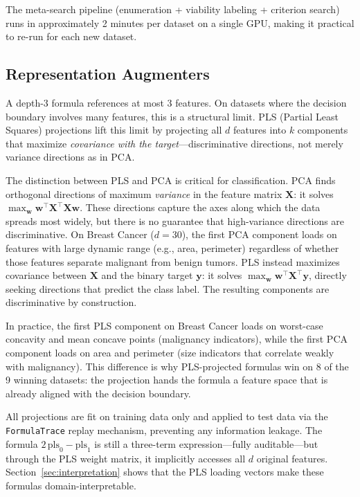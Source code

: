 \documentclass[journal]{IEEEtran}
\begin{document}
The meta-search pipeline (enumeration + viability labeling +
criterion search) runs in approximately 2 minutes per dataset on a
single GPU, making it practical to re-run for each new dataset.

\subsection{Representation Augmenters}
\label{sec:pls}

A depth-3 formula references at most 3 features.  On datasets where
the decision boundary involves many features, this is a structural
limit.  PLS (Partial Least Squares) projections lift this limit by
projecting all $d$ features into $k$ components that maximize
\emph{covariance with the target}---discriminative directions, not
merely variance directions as in PCA.

The distinction between PLS and PCA is critical for classification.
PCA finds orthogonal directions of maximum \emph{variance} in the
feature matrix $\mathbf{X}$: it solves
$\max_{\mathbf{w}} \mathbf{w}^\top \mathbf{X}^\top \mathbf{X}
\mathbf{w}$.  These directions capture the axes along which the data
spreads most widely, but there is no guarantee that high-variance
directions are discriminative.  On Breast Cancer ($d = 30$), the
first PCA component loads on features with large dynamic range
(e.g., area, perimeter) regardless of whether those features
separate malignant from benign tumors.  PLS instead maximizes
covariance between $\mathbf{X}$ and the binary target $\mathbf{y}$:
it solves $\max_{\mathbf{w}} \mathbf{w}^\top \mathbf{X}^\top
\mathbf{y}$, directly seeking directions that predict the class
label.  The resulting components are discriminative by construction.

In practice, the first PLS component on Breast Cancer loads on
worst-case concavity and mean concave points (malignancy indicators),
while the first PCA component loads on area and perimeter (size
indicators that correlate weakly with malignancy).  This difference
is why PLS-projected formulas win on 8 of the 9 winning datasets:
the projection hands the formula a feature space that is already
aligned with the decision boundary.

All projections are fit on training data only and applied to test
data via the \texttt{FormulaTrace} replay mechanism, preventing any
information leakage.  The formula
$2\,\mathrm{pls}_0 - \mathrm{pls}_1$ is still a three-term
expression---fully auditable---but through the PLS weight matrix, it
implicitly accesses all $d$ original features.
Section~\ref{sec:interpretation} shows that the PLS loading vectors
make these formulas domain-interpretable.
\end{document}
